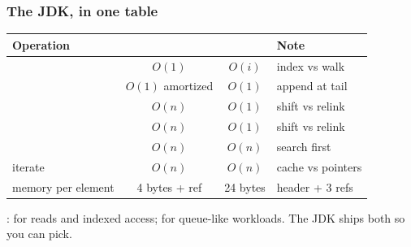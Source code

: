 \documentclass[aspectratio=169,10pt,compress]{beamer}
\begin{document}
\begin{frame}[t,fragile] \frametitle{The JDK, in one table}
  \begin{center}\footnotesize
  \begin{tabular}{@{}lccL{0.34\textwidth}@{}}
    \toprule
    \textbf{Operation} &  &  & \textbf{Note} \\
    \midrule
            & $O(1)$ & $O(i)$          & index vs walk \\
            & $O(1)$ amortized & $O(1)$ & append at tail \\
         & $O(n)$ & $O(1)$          & shift vs relink \\
         & $O(n)$ & $O(1)$          & shift vs relink \\
         & $O(n)$ & $O(n)$          & search first \\
    iterate               & $O(n)$ & $O(n)$          & cache vs pointers \\
    memory per element    & 4 bytes + ref & 24 bytes & header + 3 refs \\
    \bottomrule
  \end{tabular}
  \end{center}
  \vspace{0.3em}
  \small
  :  for reads and
  indexed access;  for queue-like workloads. The JDK
  ships both so you can pick.
\end{frame}

\end{document}
